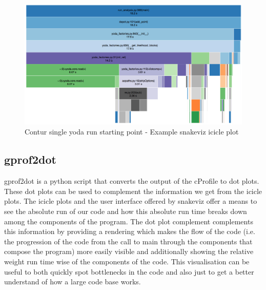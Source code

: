 \begin{figure}[H]
\centering
\includegraphics[scale=0.35]{plots/initial_single_contur.png}
\caption{Contur single yoda run starting point - Example snakeviz icicle plot}
\label{fig:single_yoda_start_profile_snakeviz}
\end{figure}

\subsection{gprof2dot}
gprof2dot is a python script that converts the output of the cProfile to dot plots. These dot plots can be used to complement the information we get from the icicle plots. The icicle plots and the user interface offered by snakeviz offer a means to see the absolute run of our code and how this absolute run time breaks down among the components of the program. The dot plot complement complements this information by providing a rendering which makes the flow of the code (i.e. the progression of the code from the call to main through the components that compose the program) more easily visible and additionally showing the relative weight run time wise of the components of the code. This visualisation can be useful to both quickly spot bottlenecks in the code and also just to get a better understand of how a large code base works.

